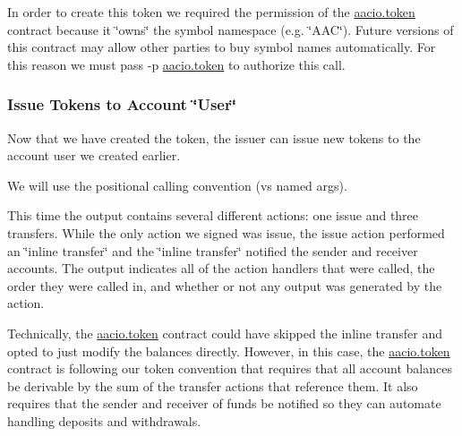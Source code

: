 In order to create this token we required the permission of the {\ttfamily \mbox{\hyperlink{classaacio_1_1token}{aacio.\+token}}} contract because it \char`\"{}owns\char`\"{} the symbol namespace (e.\+g. \char`\"{}\+A\+A\+C\char`\"{}). Future versions of this contract may allow other parties to buy symbol names automatically. For this reason we must pass {\ttfamily -\/p \mbox{\hyperlink{classaacio_1_1token}{aacio.\+token}}} to authorize this call.

\subsubsection*{Issue Tokens to Account \char`\"{}\+User\char`\"{}}

Now that we have created the token, the issuer can issue new tokens to the account {\ttfamily user} we created earlier.

We will use the positional calling convention (vs named args).




This time the output contains several different actions\+: one issue and three transfers. While the only action we signed was {\ttfamily issue}, the {\ttfamily issue} action performed an \char`\"{}inline transfer\char`\"{} and the \char`\"{}inline transfer\char`\"{} notified the sender and receiver accounts. The output indicates all of the action handlers that were called, the order they were called in, and whether or not any output was generated by the action.

Technically, the {\ttfamily \mbox{\hyperlink{classaacio_1_1token}{aacio.\+token}}} contract could have skipped the {\ttfamily inline transfer} and opted to just modify the balances directly. However, in this case, the {\ttfamily \mbox{\hyperlink{classaacio_1_1token}{aacio.\+token}}} contract is following our token convention that requires that all account balances be derivable by the sum of the transfer actions that reference them. It also requires that the sender and receiver of funds be notified so they can automate handling deposits and withdrawals.

